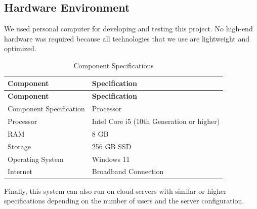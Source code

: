 \subsection{Hardware Environment}
We used personal computer for developing and testing this project. No high-end hardware was required because all technologies that we use are lightweight and optimized.

\small

\begin{longtable}{|p{5cm}|p{9cm}|}
\caption{Component Specifications} \\
\hline
\textbf{Component} & \textbf{Specification} \\
\hline
\endfirsthead

\hline
\textbf{Component} & \textbf{Specification} \\
\hline
\endhead

\hline
\endfoot

\hline
\endlastfoot

Component Specification & Processor \\
\hline
Processor & Intel Core i5 (10th Generation or higher) \\
\hline
RAM & 8 GB \\
\hline
Storage & 256 GB SSD \\
\hline
Operating System & Windows 11 \\
\hline
Internet & Broadband Connection \\
\hline

\end{longtable}

Finally, this system can also run on cloud servers with similar or higher specifications depending on the number of users and the server configuration.

